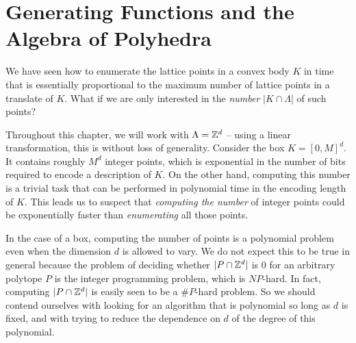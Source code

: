 %
%
%

\chapter{Generating Functions and the Algebra of Polyhedra}

We have seen how to enumerate the lattice points in a convex body $K$
in time that is essentially proportional to the maximum number of lattice points
in a translate of $K$.
What if we are only interested in the \emph{number} $|K \cap \Lambda|$ of such points?

Throughout this chapter, we will work with $\Lambda = \mathbb{Z}^d$ -- using a linear transformation,
this is without loss of generality.
Consider the box $K = [0,M]^d$.
It contains roughly $M^d$ integer points, which is exponential in the number of bits
required to encode a description of $K$.
On the other hand, computing this number is a trivial task that can be performed in
polynomial time in the encoding length of $K$.
This leads us to suspect that \emph{computing the number} of integer points could be
exponentially faster than \emph{enumerating} all those points.

In the case of a box,
computing the number of points is a polynomial problem even when the dimension $d$ is allowed to vary.
We do not expect this to be true in general
because the problem of deciding whether $|P \cap \mathbb{Z}^d|$ is $0$ for an arbitrary polytope $P$ is the integer programming problem,
which is $NP$-hard.
In fact, computing $|P \cap \mathbb{Z}^d|$ is easily seen to be a $\# P$-hard problem.
So we should contend ourselves with looking for an algorithm that is polynomial so long as $d$ is fixed,
and with trying to reduce the dependence on $d$ of the degree of this polynomial.

